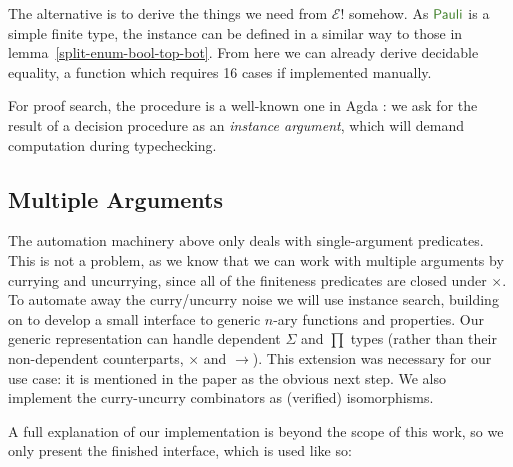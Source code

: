 The alternative is to derive the things we need from \(\mathcal{E}!\) somehow.
As \(\AgdaDatatype{Pauli}\) is a simple finite type, the instance can be defined
in a similar way to those in lemma~\ref{split-enum-bool-top-bot}.
From here we can already derive decidable equality, a function which requires 16
cases if implemented manually.

For proof search, the procedure is a well-known one in Agda
\cite{devrieseBrightSideType2011}: we ask for the result of a decision procedure
as an \emph{instance argument}, which will demand computation during
typechecking.
\subsection{Multiple Arguments}
The automation machinery above only deals with single-argument predicates.
This is not a problem, as we know that we can work with multiple arguments by
currying and uncurrying, since all of the finiteness predicates are closed under
\(\times\).
To automate away the curry/uncurry noise we will use instance search, building
on \cite{allaisGenericLevelPolymorphic2019} to develop a small interface to
generic \(n\)-ary functions and properties.
Our generic representation can handle dependent \(\Sigma\) and \(\prod\)
types (rather than their non-dependent counterparts, \(\times\) and
\(\rightarrow\)).
This extension was necessary for our use case: it is mentioned in the paper
as the obvious next step. 
We also implement the curry-uncurry combinators as (verified) isomorphisms.

A full explanation of our implementation is beyond the scope of this work, so we
only present the finished interface, which is used like so:



